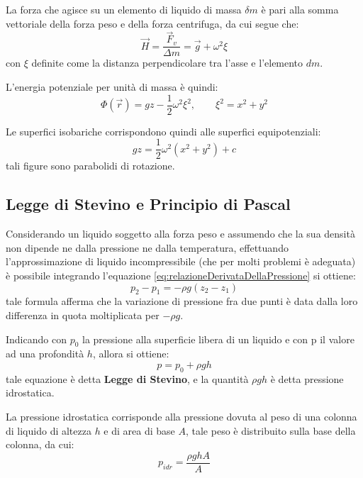\documentclass[11pt, a4paper, openright]{book}
\theoremstyle{plain}
\theoremstyle{definition}
\begin{document}
La forza che agisce su un elemento di liquido di massa $\delta m$ è pari alla somma vettoriale della forza peso e della forza centrifuga, da cui segue che:
\begin{equation}
    \vec{H} = \frac{\vec{F}_v}{\Delta m} = \vec{g} + \omega^2\xi 
\end{equation}
con $\xi$ definite come la distanza perpendicolare tra l'asse e l'elemento $dm$.

L'energia potenziale per unità di massa è quindi:
\begin{equation}
    \Phi(\vec{r}) = gz - \frac{1}{2}\omega^2\xi^2, \quad \quad \xi^2 = x^2 + y^2
\end{equation}

Le superfici isobariche corrispondono quindi alle superfici equipotenziali:
\begin{equation}
    gz = \frac{1}{2}\omega^2(x^2 + y^2) + c
\end{equation}
tali figure sono parabolidi di rotazione.

\subsection{Legge di Stevino e Principio di Pascal}
Considerando un liquido soggetto alla forza peso e assumendo che la sua densità non dipende ne dalla pressione ne dalla temperatura, effettuando l'approssimazione di liquido incompressibile (che per molti problemi è adeguata) è possibile integrando l'equazione \ref{eq:relazioneDerivataDellaPressione} si ottiene:
\begin{equation}
    p_2 - p_1 = -\rho g(z_2 - z_1)
    \label{eq:relazioniPressioneAltezze}
\end{equation}
tale formula afferma che la variazione di pressione fra due punti è data dalla loro differenza in quota moltiplicata per $-\rho g$.

Indicando con $p_0$ la pressione alla superficie libera di un liquido e con p il valore ad una profondità $h$, allora si ottiene:
\begin{equation}
    p = p_0 + \rho gh
    \label{eq:LeggeDiStevino}
\end{equation}
tale equazione è detta \textbf{Legge di Stevino}, e la quantità $\rho gh$ è detta pressione idrostatica.

La pressione idrostatica corrisponde alla pressione dovuta al peso di una colonna di liquido di altezza $h$ e di area di base $A$, tale peso è distribuito sulla base della colonna, da cui:
\begin{equation}
    p_{idr} = \frac{\rho gh A}{A}
\end{equation}
\end{document}
